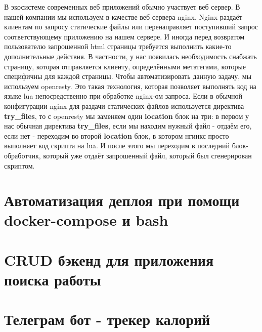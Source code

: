 \documentclass[a4papaer,12pt]{article}
\begin{document}
В экосистеме современных веб приложений обычно участвует веб сервер.
В нашей компании мы используем в качестве веб сервера nginx.
Nginx раздаёт клиентам по запросу статические файлы или перенаправляет
поступивший запрос соответствующему приложению на нашем сервере.
И иногда перед возвратом пользователю запрошенной html страницы требуется
выполнить какие-то дополнительные действия. В частности, у нас появилась
необходимость снабжать страницу, которая отправляется клиенту, определёнными метатегами,
которые специфичны для каждой страницы. Чтобы автоматизировать данную задачу,
мы используем openresty. Это такая технология, которая позволяет выполнять код на
языке lua непосредственно при обработке nginx-ом запроса.
Если в обычной конфигурации nginx для раздачи статических файлов используется директива
\textbf{try\_files}, то с openresty мы заменяем один \textbf{location} блок на три:
в первом у нас обычная директива \textbf{try\_files}, если мы находим нужный файл
- отдаём его, если нет - переходим во второй \textbf{location} блок, в котором нгинкс
просто выполняет код скрипта на lua. И после этого мы переходим в последний блок-обработчик,
который уже отдаёт запрошенный файл, который был сгенерирован скриптом.

\section{Автоматизация деплоя при помощи docker-compose и bash}
\section{CRUD бэкенд для приложения поиска работы}
\section{Телеграм бот - трекер калорий}
\end{document}
